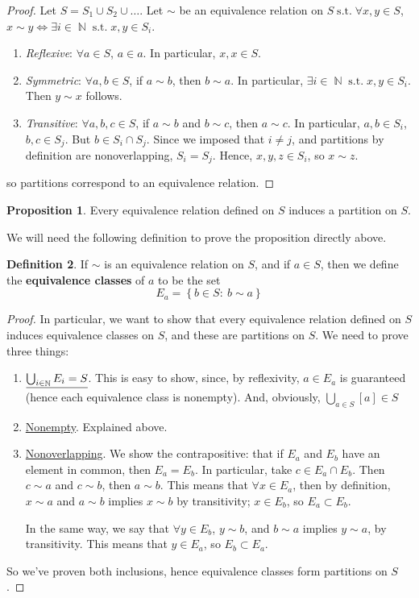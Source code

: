 \documentclass[11pt]{amsart} %
\theoremstyle{definition}
\newtheorem{definition}{Definition}[section]
\newtheorem{proposition}[definition]{Proposition}
\theoremstyle{definition}
\DeclareMathOperator{\N}{\mathbb{N}}
\DeclareMathOperator{\suchthat}{\text{ s.t. }}
\numberwithin{equation}{section}
\newcommand{\condset}[4]{\left\{ #1  : \: #2 #3 #4 \right\}}
\begin{document}
\begin{proof}
	Let $S= S_1 \cup S_2 \cup \dots $. Let $\sim$ be an equivalence relation on $S \suchthat \forall x,y \in S$, $x \sim y \iff \exists i \in \N \suchthat x,y \in S_i$.
	\begin{enumerate}[noitemsep]
		\item \textit{Reflexive}: $\forall a \in S$, $a \in a$. In particular, $x,x \in S$.
		\item \textit{Symmetric}: $\forall a,b \in S$, if $a \sim b$, then $b \sim a$. In particular, $\exists i \in \N \suchthat x , y \in S_i$. Then $y \sim x$ follows.
		\item \textit{Transitive}: $\forall a,b,c \in S$, if $a \sim b$ and $b \sim c$, then $a \sim c$. In particular, $a, b \in S_i$, $b,c \in S_j$. But $b \in S_i \cap S_j$. Since we imposed that $i \neq j$, and partitions by definition are nonoverlapping, $S_i = S_j$. Hence, $x,y,z \in S_i$, so $x \sim z$.
	\end{enumerate}		
	so partitions correspond to an equivalence relation.
\end{proof}

\begin{proposition}
	Every equivalence relation defined on $S$ induces a partition on $S$.
\end{proposition}

We will need the following definition to prove the proposition directly above.

\begin{definition}
	If $\sim $ is an equivalence relation on $S$, and if $a \in S$, then we define the \textbf{equivalence classes} of $a$ to be the set
	$$ E_a = \condset{b \in S}{b}{ \sim}{ a}$$
\end{definition}

\begin{proof}
	In particular, we want to show that every equivalence relation defined on $S$ induces equivalence classes on $S$, and these are partitions on $S$. We need to prove three things:
	\begin{enumerate}%
		\item $\uline{\bigcup_{i \in \N} E_i = S}$. This is easy to show, since, by reflexivity, $a \in E_a$ is guaranteed (hence each equivalence class is nonempty). And, obviously, $\bigcup_{a \in S} [a] \in S$
		\item  \uline{Nonempty}. Explained above.
		\item \uline{Nonoverlapping}. We show the contrapositive: that if $E_a$ and $E_b$ have an element in common, then $E_a = E_b$. In particular, take $c \in E_a \cap E_b$. Then $c\sim a $ and $c \sim b$, then $a\sim b$. This means that $\forall x \in E_a$, then by definition, $x \sim a$ and $a \sim b$ implies $x \sim b$ by transitivity; $x \in E_b$, so $E_a \subset E_b$.
		
		In the same way, we say that $\forall y \in E_b$, $y \sim b$, and $b \sim a$ implies $y \sim a$, by transitivity. This means that $y \in E_a$, so $E_b \subset E_a$.
	\end{enumerate}
	So we've proven both inclusions, hence equivalence classes form partitions on $S$.
\end{proof}
\end{document}
